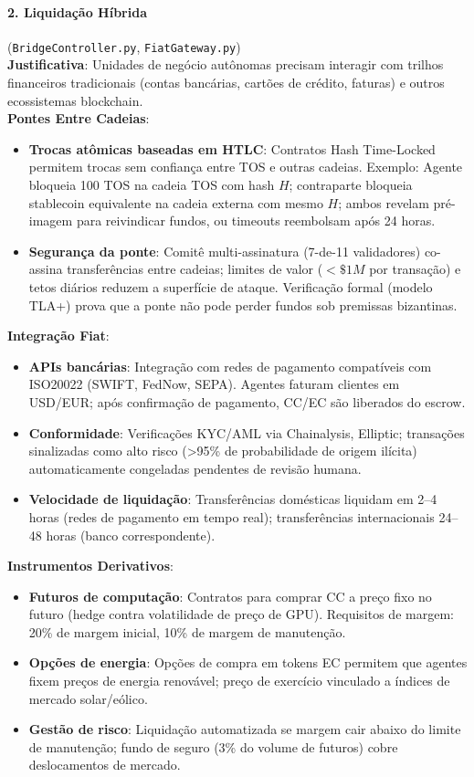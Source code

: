 \documentclass[11pt]{article}
\begin{document}
\paragraph{2. Liquidação Híbrida} (\texttt{BridgeController.py}, \texttt{FiatGateway.py})\\
\textbf{Justificativa}: Unidades de negócio autônomas precisam interagir com trilhos financeiros tradicionais (contas bancárias, cartões de crédito, faturas) e outros ecossistemas blockchain.\\
\textbf{Pontes Entre Cadeias}:
\begin{itemize}[noitemsep]
  \item \textbf{Trocas atômicas baseadas em HTLC}: Contratos Hash Time-Locked permitem trocas sem confiança entre TOS e outras cadeias. Exemplo: Agente bloqueia 100 TOS na cadeia TOS com hash $H$; contraparte bloqueia stablecoin equivalente na cadeia externa com mesmo $H$; ambos revelam pré-imagem para reivindicar fundos, ou timeouts reembolsam após 24 horas.
  \item \textbf{Segurança da ponte}: Comitê multi-assinatura (7-de-11 validadores) co-assina transferências entre cadeias; limites de valor ($<\$1M$ por transação) e tetos diários reduzem a superfície de ataque. Verificação formal (modelo TLA+) prova que a ponte não pode perder fundos sob premissas bizantinas.
\end{itemize}
\textbf{Integração Fiat}:
\begin{itemize}[noitemsep]
  \item \textbf{APIs bancárias}: Integração com redes de pagamento compatíveis com ISO20022 (SWIFT, FedNow, SEPA). Agentes faturam clientes em USD/EUR; após confirmação de pagamento, CC/EC são liberados do escrow.
  \item \textbf{Conformidade}: Verificações KYC/AML via Chainalysis, Elliptic; transações sinalizadas como alto risco (>95\% de probabilidade de origem ilícita) automaticamente congeladas pendentes de revisão humana.
  \item \textbf{Velocidade de liquidação}: Transferências domésticas liquidam em 2--4 horas (redes de pagamento em tempo real); transferências internacionais 24--48 horas (banco correspondente).
\end{itemize}
\textbf{Instrumentos Derivativos}:
\begin{itemize}[noitemsep]
  \item \textbf{Futuros de computação}: Contratos para comprar CC a preço fixo no futuro (hedge contra volatilidade de preço de GPU). Requisitos de margem: 20\% de margem inicial, 10\% de margem de manutenção.
  \item \textbf{Opções de energia}: Opções de compra em tokens EC permitem que agentes fixem preços de energia renovável; preço de exercício vinculado a índices de mercado solar/eólico.
  \item \textbf{Gestão de risco}: Liquidação automatizada se margem cair abaixo do limite de manutenção; fundo de seguro (3\% do volume de futuros) cobre deslocamentos de mercado.
\end{itemize}
\end{document}
